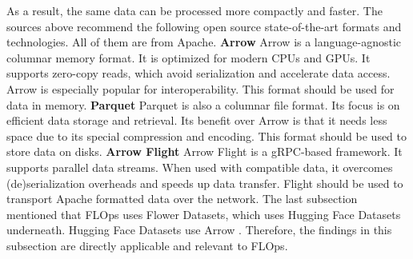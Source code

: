 As a result, the same data can be processed more compactly and faster.
\vspace{5mm}
\newline
The sources above recommend the following open source state-of-the-art formats and technologies.
All of them are from Apache.
\vspace{5mm}
\newline
\textbf{Arrow}\newline
Arrow \cite{arrow_repo} is a language-agnostic columnar memory format.
It is optimized for modern CPUs and GPUs.
It supports zero-copy reads, which avoid serialization and accelerate data access.
Arrow is especially popular for interoperability.
This format should be used for data in memory.
\vspace{5mm}
\newline
\textbf{Parquet}\newline
Parquet \cite{docs:parquet} is also a columnar file format.
Its focus is on efficient data storage and retrieval.
Its benefit over Arrow is that it needs less space due to its special compression and encoding.
This format should be used to store data on disks.
\vspace{5mm}
\newline
\textbf{Arrow Flight}\newline
Arrow Flight \cite{docs:arrow_flight} is a gRPC-based framework.
It supports parallel data streams.
When used with compatible data, it overcomes (de)serialization overheads and speeds up data transfer.
Flight should be used to transport Apache formatted data over the network.
\vspace{5mm}
\newline
The last subsection mentioned that FLOps uses Flower Datasets, which uses Hugging Face Datasets underneath.
Hugging Face Datasets use Arrow \cite{docs:hugging_face_arrow}.
Therefore, the findings in this subsection are directly applicable and relevant to FLOps.